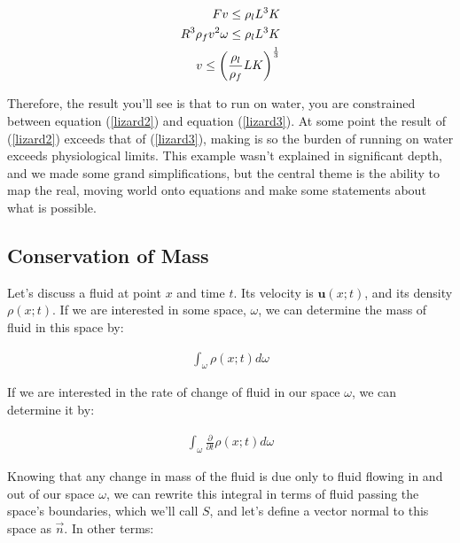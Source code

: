 \begin{equation} \label{lizard3}
\begin{split}
F v \leq \rho_l L^3 K \\
R^3\rho_f v^2\omega \leq \rho_l L^3 K \\
v \leq \left(\frac{\rho_l}{\rho_f} L K\right)^{\frac{1}{3}} \\
\end{split}
\end{equation}

Therefore, the result you'll see is that to run on water, you are constrained between equation (\ref{lizard2}) and equation (\ref{lizard3}). At some point the result of (\ref{lizard2}) exceeds that of (\ref{lizard3}), making is so the burden of running on water exceeds physiological limits. This example wasn't explained in significant depth, and we made some grand simplifications, but the central theme is the ability to map the real, moving world onto equations and make some statements about what is possible. 


\subsection{Conservation of Mass}

Let's discuss a fluid at point $x$ and time $t$. Its velocity is $\mathbf{u}(x;t)$, and its density $\rho(x;t)$. If we are interested in some space, $\omega$, we can determine the mass of fluid in this space by: 

\begin{equation} \label{phenom1}
\begin{split}
\int_\omega \rho(x;t)d\omega
\end{split}
\end{equation}

If we are interested in the rate of change of fluid in our space $\omega$, we can determine it by:

\begin{equation} \label{phenom1}
\begin{split}
\int_\omega
\frac{\partial}{\partial t}\rho(x;t)d\omega
\end{split}
\end{equation}

Knowing that any change in mass of the fluid is due only to fluid flowing in and out of our space $\omega$, we can rewrite this integral in terms of fluid passing the space's boundaries, which we'll call $S$, and let's define a vector normal to this space as $\Vec{n}$. In other terms: 

